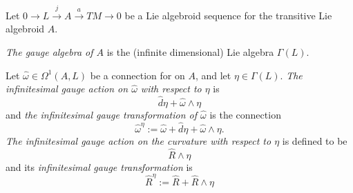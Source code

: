 



Let $0 \to L \xrightarrow{j} A \xrightarrow{a} TM \to 0$ be a Lie algebroid sequence for the transitive Lie algebroid $A$.

\begin{definition}
\emph{The gauge algebra of $A$} is the (infinite dimensional) Lie algebra $\Gamma(L)$.
\end{definition}

\begin{definition}\label{definitionInfinitesimalGaugeActionAndTransformationForAlgebroidFormsAndCurvature}
Let $\hat \omega \in \Omega^1(A, L)$ be a connection for on $A$, and let $\eta \in \Gamma(L)$. \emph{The infinitesimal gauge action on $\hat \omega$ with respect to $\eta$} is 
\begin{equation}
    \hat d \eta + \hat \omega \wedge \eta
\end{equation}
and \emph{the infinitesimal gauge transformation of $\hat \omega$} is the connection
\begin{equation}
    \hat \omega^\eta := \hat \omega + \hat d \eta + \hat \omega \wedge \eta.
\end{equation}
\emph{The infinitesimal gauge action on the curvature with respect to $\eta$} is defined to be
\begin{equation}
    \hat R \wedge \eta
\end{equation}
and its \emph{infinitesimal gauge transformation} is
\begin{equation}
    \hat R^\eta := \hat R + \hat R \wedge \eta
\end{equation}
\end{definition}

